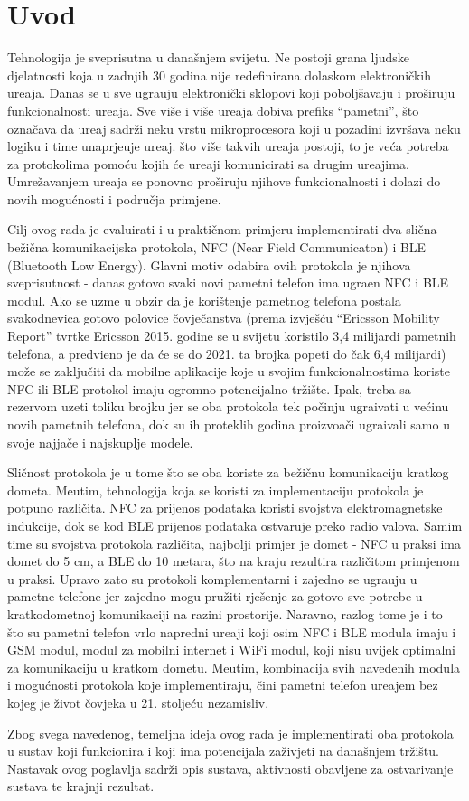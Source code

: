\chapter{Uvod}

Tehnologija je sveprisutna u dana\v{s}njem svijetu. Ne postoji grana ljudske djelatnosti koja u zadnjih 30 godina nije redefinirana dolaskom elektroni\v{c}kih ure\dj aja. Danas se u sve ugra\dj uju elektroni\v{c}ki sklopovi koji pobolj\v{s}avaju i pro\v{s}iruju funkcionalnosti ure\dj aja. Sve vi\v{s}e i vi\v{s}e ure\dj aja dobiva prefiks ``pametni'', \v{s}to ozna\v{c}ava da ure\dj aj sadr\v{z}i neku vrstu mikroprocesora koji u pozadini izvr\v{s}ava neku logiku i time unaprje\dj uje ure\dj aj. \v{s}to vi\v{s}e takvih ure\dj aja postoji, to je ve\'{c}a potreba za protokolima pomo\'{c}u kojih \'{c}e ure\dj aji komunicirati sa drugim ure\dj ajima. Umre\v{z}avanjem ure\dj aja se ponovno pro\v{s}iruju njihove funkcionalnosti i dolazi do novih mogu\'{c}nosti i podru\v{c}ja primjene.

Cilj ovog rada je evaluirati i u prakti\v{c}nom primjeru implementirati dva sli\v{c}na be\v{z}i\v{c}na komunikacijska protokola, NFC (Near Field Communicaton) i BLE (Bluetooth Low Energy). Glavni motiv odabira ovih protokola je njihova sveprisutnost -  danas gotovo svaki novi pametni telefon ima ugra\dj en NFC i BLE modul. Ako se uzme u obzir da je kori\v{s}tenje pametnog telefona postala svakodnevica gotovo polovice \v{c}ovje\v{c}anstva (prema izvje\v{s}\'{c}u ``Ericsson Mobility Report'' tvrtke Ericsson \cite{mobilityReport} 2015. godine se u svijetu koristilo 3,4 milijardi pametnih telefona, a predvi\dj eno je da \'{c}e se do 2021. ta brojka popeti do \v{c}ak 6,4 milijardi) mo\v{z}e se zaklju\v{c}iti da mobilne aplikacije koje u svojim funkcionalnostima koriste NFC ili BLE protokol imaju ogromno potencijalno tr\v{z}i\v{s}te. Ipak, treba sa rezervom uzeti toliku brojku jer se oba protokola tek po\v{c}inju ugra\dj ivati u ve\'{c}inu novih pametnih telefona, dok su ih proteklih godina proizvo\dj a\v{c}i ugra\dj ivali samo u svoje najja\v{c}e i najskuplje modele.

Sli\v{c}nost protokola je u tome \v{s}to se oba koriste za be\v{z}i\v{c}nu komunikaciju kratkog dometa. Me\dj utim, tehnologija koja se koristi za implementaciju protokola je potpuno razli\v{c}ita. NFC za prijenos podataka koristi svojstva elektromagnetske indukcije, dok se kod BLE prijenos podataka ostvaruje preko radio valova. Samim time su svojstva protokola razli\v{c}ita, najbolji primjer je domet - NFC u praksi ima domet do 5 cm, a BLE do 10 metara, \v{s}to na kraju rezultira razli\v{c}itom primjenom u praksi. Upravo zato su protokoli komplementarni i zajedno se ugra\dj uju u pametne telefone jer zajedno mogu pru\v{z}iti rje\v{s}enje za gotovo sve potrebe u kratkodometnoj komunikaciji na razini prostorije. Naravno, razlog tome je i to \v{s}to su pametni telefon vrlo napredni ure\dj aji koji osim NFC i BLE modula imaju i GSM modul, modul za mobilni internet i WiFi modul, koji nisu uvijek optimalni za komunikaciju u kratkom dometu. Me\dj utim, kombinacija svih navedenih modula i mogu\'{c}nosti protokola koje implementiraju, \v{c}ini pametni telefon ure\dj ajem bez kojeg je \v{z}ivot \v{c}ovjeka u 21. stolje\'{c}u nezamisliv.

Zbog svega navedenog, temeljna ideja ovog rada je implementirati oba protokola u sustav koji funkcionira i koji ima potencijala za\v{z}ivjeti na dana\v{s}njem tr\v{z}i\v{s}tu. Nastavak ovog poglavlja sadr\v{z}i opis sustava, aktivnosti obavljene za ostvarivanje sustava te krajnji rezultat.

